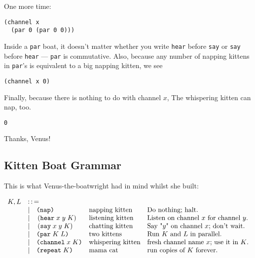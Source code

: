 \documentclass[10pt,oneside,x11names]{article}
\newcommand{\Coloneqq}{\mathrel{\vcenter{\hbox{$:\,:\,=$}}{}}}
\theoremstyle{definition}
\theoremstyle{warning}
\newcommand\say [3]{\left(\texttt{say}\thickspace{}#1\thickspace{}#2\thickspace{}#3\right)}
\newcommand\hear[3]{\left(\texttt{hear}\thickspace{}#1\thickspace{}#2\thickspace{}#3\right)}
\newcommand\knapping    [0]{\texttt{(nap)}}
\newcommand\kpar        [2]{\texttt{(par}\thickspace{}#1\thickspace{}#2\texttt{)}}
\newcommand\kwhispering [2]{\texttt{(channel}\thickspace{}#1\thickspace{}#2\texttt{)}}
\newcommand\kmama       [1]{\texttt{(repeat}\thickspace{}#1\texttt{)}}
\begin{document}
One more time:

\vskip 0.26cm
\begin{verbatim}
(channel x
  (par 0 (par 0 0)))
\end{verbatim}

Inside a \texttt{par} boat, it doesn't matter whether you write \texttt{hear}
before \texttt{say} or \texttt{say} before \texttt{hear} --- \texttt{par} is commutative.
Also, because any number of napping kittens in \texttt{par}'s is
equivalent to a big napping kitten, we see

\vskip 0.26cm
\begin{verbatim}
(channel x 0)
\end{verbatim}

Finally, because there is nothing to do with channel \(x\), The
whispering kitten can nap, too.

\vskip 0.26cm
\begin{verbatim}
0
\end{verbatim}

Thanks, Venus!

\subsection{Kitten Boat Grammar}
\label{sec:org35988c7}

This is what Venus-the-boatwright had in mind whilst she built:

\begin{equation}
\begin{array}{clll}
  K, L & \Coloneqq \\
       & | \quad \knapping            & \textrm{napping kitten}    & \textrm{Do nothing; halt.}                                   \\
       & | \quad \hear{x}{y}{K}       & \textrm{listening kitten}  & \textrm{Listen on channel }x\textrm{ for channel }y.         \\
       & | \quad \say{x}{y}{K}        & \textrm{chatting kitten}   & \textrm{Say "}y\textrm{" on channel }x\textrm{; don't wait.} \\
       & | \quad \kpar{K}{L}          & \textrm{two kittens}       & \textrm{Run }K\textrm{ and }L\textrm{ in parallel.}          \\
       & | \quad \kwhispering{x}{K}   & \textrm{whispering kitten} & \textrm{fresh channel name }x\textrm{; use it in }K\textrm{.}\\
       & | \quad \kmama{K}            & \textrm{mama cat}          & \textrm{run copies of }K\textrm{ forever}\textrm{.}          \\
\end{array}
\end{equation}
\end{document}
